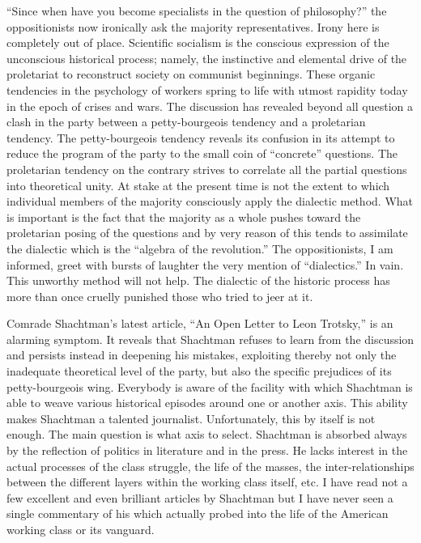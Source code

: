 “Since when have you become specialists in the question of philosophy?” the oppositionists now ironically ask the majority representatives. Irony here is completely out of place. Scientific socialism is the conscious expression of the unconscious historical process; namely, the instinctive and elemental drive of the proletariat to reconstruct society on communist beginnings. These organic tendencies in the psychology of workers spring to life with utmost rapidity today in the epoch of crises and wars. The discussion has revealed beyond all question a clash in the party between a petty-bourgeois tendency and a proletarian tendency. The petty-bourgeois tendency reveals its confusion in its attempt to reduce the program of the party to the small coin of “concrete” questions. The proletarian tendency on the contrary strives to correlate all the partial questions into theoretical unity. At stake at the present time is not the extent to which individual members of the majority consciously apply the dialectic method. What is important is the fact that the majority as a whole pushes toward the proletarian posing of the questions and by very reason of this tends to assimilate the dialectic which is the “algebra of the revolution.” The oppositionists, I am informed, greet with bursts of laughter the very mention of “dialectics.” In vain. This unworthy method will not help. The dialectic of the historic process has more than once cruelly punished those who tried to jeer at it.

Comrade Shachtman’s latest article, ``An Open Letter to Leon Trotsky,'' is an alarming symptom. It reveals that Shachtman refuses to learn from the discussion and persists instead in deepening his mistakes, exploiting thereby not only the inadequate theoretical level of the party, but also the specific prejudices of its petty-bourgeois wing. Everybody is aware of the facility with which Shachtman is able to weave various historical episodes around one or another axis. This ability makes Shachtman a talented journalist. Unfortunately, this by itself is not enough. The main question is what axis to select. Shachtman is absorbed always by the reflection of politics in literature and in the press. He lacks interest in the actual processes of the class struggle, the life of the masses, the inter-relationships between the different layers within the working class itself, etc. I have read not a few excellent and even brilliant articles by Shachtman but I have never seen a single commentary of his which actually probed into the life of the American working class or its vanguard.

